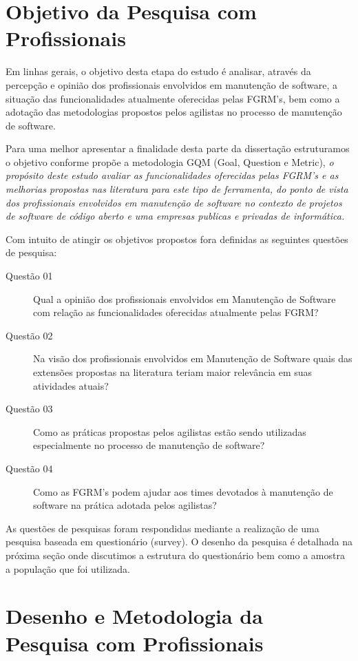\section{Objetivo da Pesquisa com Profissionais}
\label{sec:objetivo_da_pesquisa_com_profissionais}

Em linhas gerais, o objetivo desta etapa do estudo é analisar, através da
percepção e opinião dos profissionais envolvidos em manutenção de software, a
situação das funcionalidades atualmente oferecidas pelas FGRM's, bem como
a adotação das metodologias propostos pelos agilistas no processo de manutenção
de software.

Para uma melhor apresentar a finalidade desta parte da dissertação estruturamos
o objetivo conforme propõe a metodologia GQM (Goal, Question e
Metric)\cite{gqm}, \textit{o propósito deste estudo avaliar as funcionalidades
	oferecidas pelas FGRM's e as melhorias propostas nas literatura para este
	tipo de ferramenta, do ponto de vista dos profissionais envolvidos em
	manutenção de software no contexto de projetos de software de código aberto
	e uma empresas publicas e privadas de informática.}

Com intuito de atingir os objetivos propostos fora definidas as seguintes
questões de pesquisa:

\begin{description}
	\item[Questão 01] Qual a opinião dos profissionais envolvidos em Manutenção
		de Software com relação as funcionalidades oferecidas atualmente pelas
		FGRM\@?
	\item[Questão 02] Na visão dos profissionais envolvidos em Manutenção de
		Software quais das extensões propostas na literatura teriam maior
		relevância em suas atividades atuais?
	\item[Questão 03] Como as práticas propostas pelos agilistas estão sendo
	utilizadas especialmente no processo de manutenção de software?
	\item[Questão 04] Como as FGRM's podem ajudar aos times devotados à manutenção
	de software na prática adotada pelos agilistas?
\end{description}

As questões de pesquisas foram respondidas mediante a realização de uma pesquisa
baseada em questionário (survey). O desenho da pesquisa é detalhada na próxima
seção onde discutimos a estrutura do questionário bem como a amostra a população
que foi utilizada.

\section{Desenho e Metodologia da Pesquisa com Profissionais}
\label{sec:desenho_da_pesquisa_com_profissionais}

